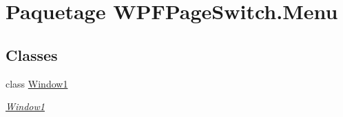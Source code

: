 \hypertarget{namespace_w_p_f_page_switch_1_1_menu}{\section{Paquetage W\+P\+F\+Page\+Switch.\+Menu}
\label{namespace_w_p_f_page_switch_1_1_menu}
}
\subsection*{Classes}
\begin{DoxyCompactItemize}
\item 
class \hyperlink{class_w_p_f_page_switch_1_1_menu_1_1_window1}{Window1}
\begin{DoxyCompactList}\small\item\em \hyperlink{class_w_p_f_page_switch_1_1_menu_1_1_window1}{Window1} \end{DoxyCompactList}\end{DoxyCompactItemize}
